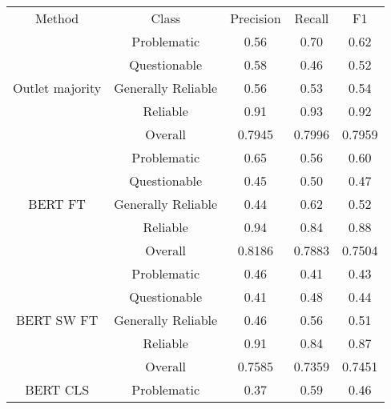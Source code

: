 \begin{table}[htbp]
    \centering
    \small
    \begin{tabular}{| c | c | c | c | c |}
        \hline                            Method & Class              & Precision & Recall & F1     \\\cline{1-5}
        \multirow{5}{*}{Outlet majority}         & Problematic        & 0.56      & 0.70   & 0.62   \\
                                                 & Questionable       & 0.58      & 0.46   & 0.52   \\
                                                 & Generally Reliable & 0.56      & 0.53   & 0.54   \\
                                                 & Reliable           & 0.91      & 0.93   & 0.92   \\
                                                 & Overall            & 0.7945    & 0.7996 & 0.7959 \\
        \hline
        \multirow{5}{*}{BERT FT}                 & Problematic        & 0.65      & 0.56   & 0.60   \\
                                                 & Questionable       & 0.45      & 0.50   & 0.47   \\
                                                 & Generally Reliable & 0.44      & 0.62   & 0.52   \\
                                                 & Reliable           & 0.94      & 0.84   & 0.88   \\
                                                 & Overall            & 0.8186    & 0.7883 & 0.7504 \\
        \hline
        \multirow{5}{*}{BERT SW FT}              & Problematic        & 0.46      & 0.41   & 0.43   \\
                                                 & Questionable       & 0.41      & 0.48   & 0.44   \\
                                                 & Generally Reliable & 0.46      & 0.56   & 0.51   \\
                                                 & Reliable           & 0.91      & 0.84   & 0.87   \\
                                                 & Overall            & 0.7585    & 0.7359 & 0.7451 \\
        \hline
        \multirow{5}{*}{BERT CLS}                & Problematic        & 0.37      & 0.59   & 0.46   \\

\end{tabular}
\end{table}
